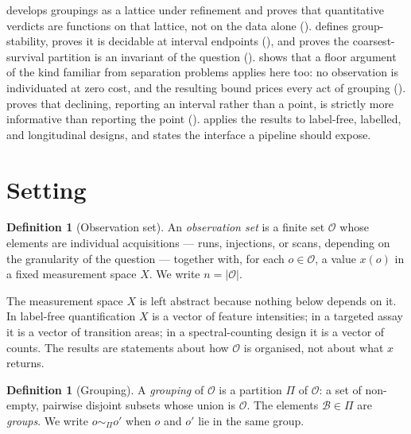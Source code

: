 \documentclass[11pt,a4paper]{article}
\theoremstyle{definition}
\newtheorem{definition}[theorem]{Definition}
\theoremstyle{remark}
\newcommand{\Obs}{\mathcal{O}}               %
\newcommand{\grp}{\mathcal{B}}               %
\newcommand{\Part}{\Pi}                      %
\newcommand{\rel}{\sim}
\begin{document}
 develops groupings as a lattice under refinement and
proves that quantitative verdicts are functions on that lattice, not on
the data alone ().  defines
group-stability, proves it is decidable at interval endpoints
(), and proves the coarsest-survival partition is an
invariant of the question ().
 shows that a floor argument of the kind familiar from
separation problems applies here too: no observation is individuated at
zero cost, and the resulting bound prices every act of grouping
().  proves that declining,
reporting an interval rather than a point, is strictly more informative
than reporting the point ().
 applies the results to label-free, labelled, and
longitudinal designs, and states the interface a pipeline should expose.

\section{Setting}
\label{sec:setting}

\begin{definition}[Observation set]\label{def:obs}
An \emph{observation set} is a finite set $\Obs$ whose elements are
individual acquisitions --- runs, injections, or scans, depending on the
granularity of the question --- together with, for each $o \in \Obs$, a
value $x(o)$ in a fixed measurement space $X$. We write $n = |\Obs|$.
\end{definition}

The measurement space $X$ is left abstract because nothing below depends
on it. In label-free quantification $X$ is a vector of feature
intensities; in a targeted assay it is a vector of transition areas; in a
spectral-counting design it is a vector of counts. The results are
statements about how $\Obs$ is organised, not about what $x$ returns.

\begin{definition}[Grouping]\label{def:grouping}
A \emph{grouping} of $\Obs$ is a partition $\Part$ of $\Obs$: a set of
non-empty, pairwise disjoint subsets whose union is $\Obs$. The elements
$\grp \in \Part$ are \emph{groups}. We write $o \rel_{\Part} o'$ when $o$
and $o'$ lie in the same group.
\end{definition}
\end{document}
